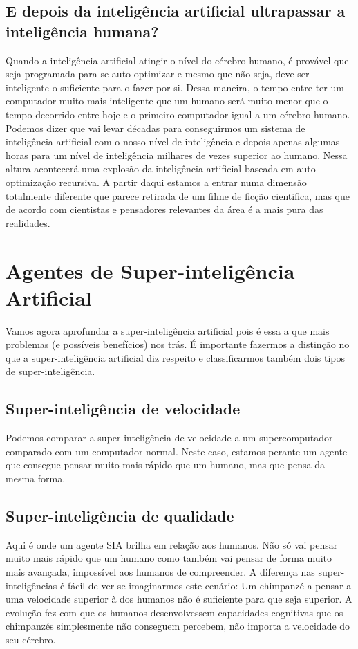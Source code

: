 \documentclass[runningheads,a4paper]{llncs}
\begin{document}
\subsection*{E depois da inteligência artificial ultrapassar a inteligência humana?}

Quando a inteligência artificial atingir o nível do cérebro humano, é provável que seja programada para se auto-optimizar e mesmo que não seja, deve ser inteligente o suficiente para o fazer por si. Dessa maneira, o tempo entre ter um computador muito mais inteligente que um humano será muito menor que o tempo decorrido entre hoje e o primeiro computador igual a um cérebro humano. Podemos dizer que vai levar décadas para conseguirmos um sistema de inteligência artificial com o nosso nível de inteligência e depois apenas algumas horas para um nível de inteligência milhares de vezes superior ao humano.
Nessa altura acontecerá uma explosão da inteligência artificial baseada em auto-optimização recursiva. A partir daqui estamos a entrar numa dimensão totalmente diferente que parece retirada de um filme de ficção cientifica, mas que de acordo com cientistas e pensadores relevantes da área é a mais pura das realidades.


\section{Agentes de Super-inteligência Artificial}

Vamos agora aprofundar a super-inteligência artificial pois é essa a que mais problemas (e possíveis benefícios) nos trás. É importante fazermos a distinção no que a super-inteligência artificial diz respeito e classificarmos também dois tipos de super-inteligência.

\subsection{Super-inteligência de velocidade}

Podemos comparar a super-inteligência de velocidade a um supercomputador comparado com um computador normal. Neste caso, estamos perante um agente que consegue pensar muito mais rápido que um humano, mas que pensa da mesma forma.

\subsection{Super-inteligência de qualidade}

Aqui é onde um agente SIA brilha em relação aos humanos. Não só vai pensar muito mais rápido que um humano como também vai pensar de forma muito mais avançada, impossível aos humanos de compreender. A diferença nas super-inteligências é fácil de ver se imaginarmos este cenário: Um chimpanzé a pensar a uma velocidade superior à dos humanos não é suficiente para que seja superior. A evolução fez com que os humanos desenvolvessem capacidades cognitivas que os chimpanzés simplesmente não conseguem percebem, não importa a velocidade do seu cérebro.
\end{document}
